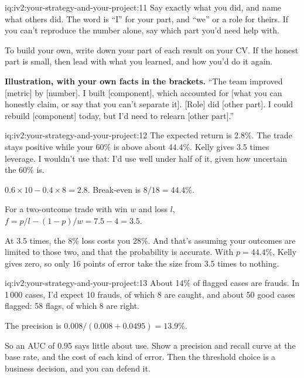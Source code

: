 \begin{solution}{iq:iv2:your-strategy-and-your-project:11}
Say exactly what you did, and name what others did. The word is ``I'' for your part, and ``we'' or a role for theirs. If you can't reproduce the number alone, say which part you'd need help with.

To build your own, write down your part of each result on your CV. If the honest part is small, then lead with what you learned, and how you'd do it again.

\textbf{Illustration, with your own facts in the brackets.} ``The team improved [metric] by [number]. I built [component], which accounted for [what you can honestly claim, or say that you can't separate it]. [Role] did [other part]. I could rebuild [component] today, but I'd need to relearn [other part].''

\end{solution}

\begin{solution}{iq:iv2:your-strategy-and-your-project:12}
The expected return is 2.8\%. The trade stays positive while your 60\% is above about 44.4\%. Kelly gives 3.5 times leverage. I wouldn't use that: I'd use well under half of it, given how uncertain the 60\% is.

$0.6 \times 10 - 0.4 \times 8 = 2.8$. Break-even is $8/18 = 44.4\%$.

For a two-outcome trade with win $w$ and loss $l$, $f = p/l - (1 - p)/w = 7.5 - 4 = 3.5$.

At 3.5 times, the 8\% loss costs you 28\%. And that's assuming your outcomes are limited to those two, and that the probability is accurate. With $p = 44.4\%$, Kelly gives zero, so only 16 points of error take the size from 3.5 times to nothing.

\end{solution}

\begin{solution}{iq:iv2:your-strategy-and-your-project:13}
About 14\% of flagged cases are frauds. In 1\,000 cases, I'd expect 10 frauds, of which 8 are caught, and about 50 good cases flagged: 58 flags, of which 8 are right.

The precision is $0.008/(0.008 + 0.0495) = 13.9\%$.

So an AUC of 0.95 says little about use. Show a precision and recall curve at the base rate, and the cost of each kind of error. Then the threshold choice is a business decision, and you can defend it.

\end{solution}

